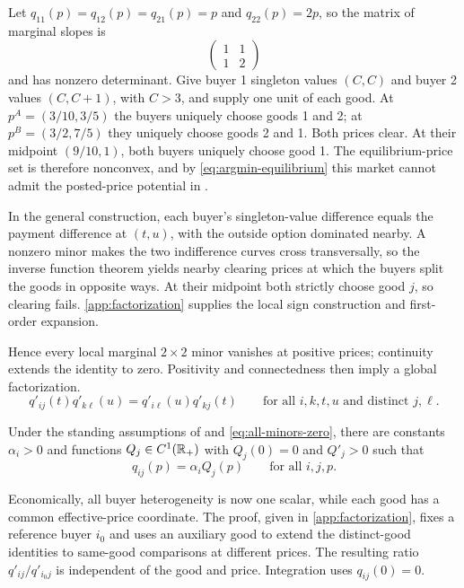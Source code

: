 \begin{example}\label{ex:two-by-two}
Let $q_{11}(p)=q_{12}(p)=q_{21}(p)=p$ and $q_{22}(p)=2p$, so the matrix of marginal slopes is
\[
\begin{pmatrix}1&1\\1&2\end{pmatrix}
\]
and has nonzero determinant. Give buyer 1 singleton values $(C,C)$ and buyer 2 values $(C,C+1)$, with $C>3$, and supply one unit of each good. At $p^A=(3/10,3/5)$ the buyers uniquely choose goods 1 and 2; at $p^B=(3/2,7/5)$ they uniquely choose goods 2 and 1. Both prices clear. At their midpoint $(9/10,1)$, both buyers uniquely choose good 1. The equilibrium-price set is therefore nonconvex, and by \eqref{eq:argmin-equilibrium} this market cannot admit the posted-price potential in .
\end{example}

In the general construction, each buyer's singleton-value difference equals the payment difference at $(t,u)$, with the outside option dominated nearby. A nonzero minor makes the two indifference curves cross transversally, so the inverse function theorem yields nearby clearing prices at which the buyers split the goods in opposite ways. At their midpoint both strictly choose good $j$, so clearing fails. \ref{app:factorization} supplies the local sign construction and first-order expansion.

Hence every local marginal $2\times2$ minor vanishes at positive prices; continuity extends the identity to zero. Positivity and connectedness then imply a global factorization.
\begin{equation}\label{eq:all-minors-zero}
q'_{ij}(t)q'_{k\ell}(u)
=q'_{i\ell}(u)q'_{kj}(t)
\qquad\text{for all }i,k,t,u\text{ and distinct }j,\ell.
\end{equation}

\begin{lemma}\label{lem:smooth-factorization}
Under the standing assumptions of  and \eqref{eq:all-minors-zero}, there are constants $\alpha_i>0$ and functions $Q_j\in C^1(\mathbb{R}_+)$ with $Q_j(0)=0$ and $Q'_j>0$ such that
\begin{equation}\label{eq:smooth-factorization}
q_{ij}(p)=\alpha_iQ_j(p)
\qquad\text{for all }i,j,p.
\end{equation}
\end{lemma}

Economically, all buyer heterogeneity is now one scalar, while each good has a common effective-price coordinate. The proof, given in \ref{app:factorization}, fixes a reference buyer $i_0$ and uses an auxiliary good to extend the distinct-good identities to same-good comparisons at different prices. The resulting ratio $q'_{ij}/q'_{i_0j}$ is independent of the good and price. Integration uses $q_{ij}(0)=0$.

